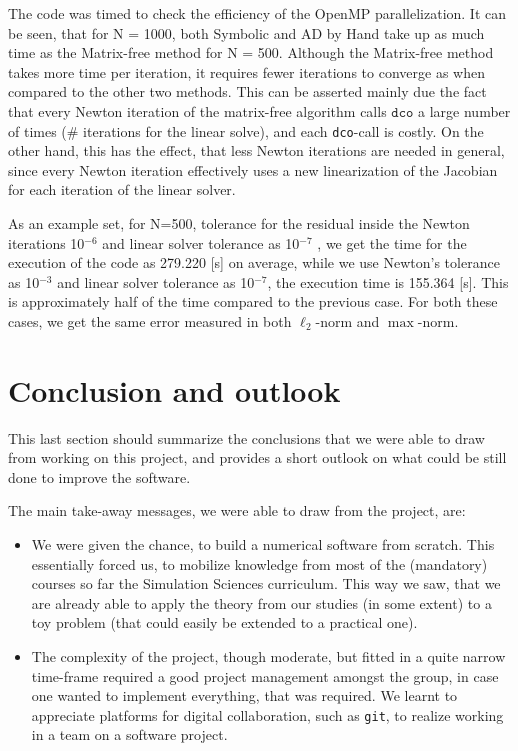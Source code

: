 \documentclass[11pt]{scrartcl}
\begin{document}
The code was timed to check the efficiency of the OpenMP parallelization. It can be seen, that for N = 1000, both Symbolic and AD by Hand take up as much time as the Matrix-free method for N = 500. Although the Matrix-free method takes more time per iteration, it requires fewer iterations to converge as when compared to the other two methods.
This can be asserted mainly due the fact that every Newton iteration of the matrix-free algorithm calls $\texttt{dco}$ a large number of times (\# iterations for the linear solve), and each \texttt{dco}-call is costly. On the other hand, this has the effect, that less Newton iterations are needed in general, since every Newton iteration effectively uses a new linearization of the Jacobian for each iteration of the linear solver.

As an example set, for N=500, tolerance for the residual inside the Newton iterations 10$^{-6}$ and linear solver tolerance as 10$^{-7}$ , we get the time for the execution of the code as 279.220 [s] on average, while we use Newton's tolerance as 10$^{-3}$ and linear solver tolerance as 10$^{-7}$, the execution time is 155.364 [s]. This is approximately half of the time compared to the previous case. For both these cases, we get the same error measured in both $\ell_2$-norm and $\max$-norm.

\newpage
\section{Conclusion and outlook}
This last section should summarize the conclusions that we were able to draw from working on this project, and provides a short outlook on what could be still done to improve the software.

The main take-away messages, we were able to draw from the project, are:
\begin{itemize}
	\item We were given the chance, to build a numerical software from scratch. This essentially forced us, to mobilize knowledge from most of the (mandatory) courses so far the Simulation Sciences curriculum. This way we saw, that we are already able to apply the theory from our studies (in some extent) to a toy problem (that could easily be extended to a practical one).
	\item The complexity of the project, though moderate, but fitted in a quite narrow time-frame required a good project management amongst the group, in case one wanted to implement everything, that was required. We learnt to appreciate platforms for digital collaboration, such as \texttt{git}, to realize working in a team on a software project.
\end{itemize}
\end{document}
